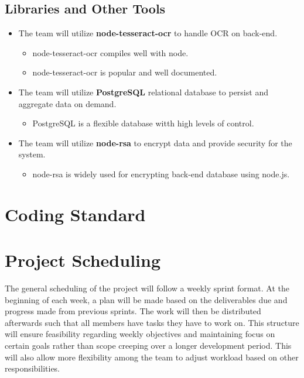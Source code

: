 \documentclass{article}
\begin{document}
\subsection{Libraries and Other Tools}
    \begin{itemize}
        \item The team will utilize \textbf{node-tesseract-ocr} to handle OCR on back-end.
        \begin{itemize}
            \item node-tesseract-ocr compiles well with node.
            \item node-tesseract-ocr is popular and well documented.
        \end{itemize}
        \item The team will utilize \textbf{PostgreSQL} relational database to persist and aggregate data on demand.
        \begin{itemize}
            \item PostgreSQL is a flexible database witth high levels of control.
        \end{itemize}
        \item The team will utilize \textbf{node-rsa} to encrypt data and provide security for the system.
        \begin{itemize}
            \item node-rsa is widely used for encrypting back-end database using node.js.
        \end{itemize}
    \end{itemize}

\section{Coding Standard}

\section{Project Scheduling}

The general scheduling of the project will follow a weekly sprint format. At the beginning
of each week, a plan will be made based on the deliverables due and progress made from previous sprints. The
work will then be distributed afterwards such that all members have tasks they have
to work on. This structure will ensure feasibility regarding weekly
objectives and maintaining focus on certain goals rather than scope creeping over
a longer development period. This will also allow more flexibility among the team to adjust workload
based on other responsibilities. \par
\end{document}
